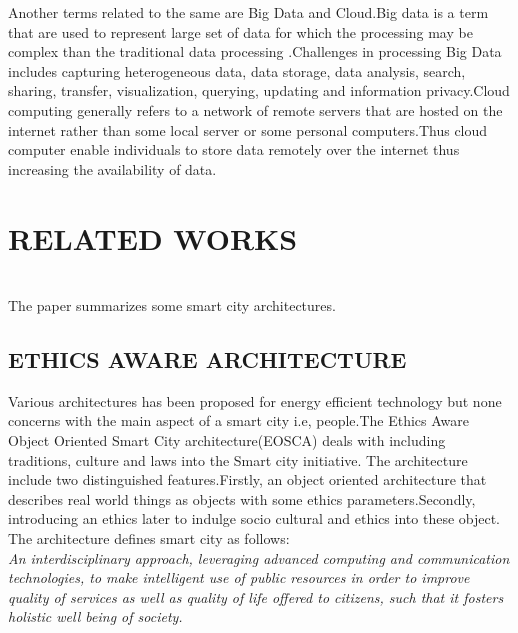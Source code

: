 \documentclass[10pt,a4paper,journal]{IEEEtran}
\begin{document}
\hspace{2em}Another terms related to the same are Big Data and Cloud.Big data is a term that are used to represent large set of data for which the processing may be complex than the traditional data processing .Challenges in processing Big Data includes  capturing heterogeneous data, data storage, data analysis, search, sharing, transfer, visualization, querying, updating and information privacy.Cloud computing generally refers to a network of remote servers that are hosted on the internet rather than some local server or some personal computers.Thus cloud computer enable individuals to store data remotely over the internet thus increasing the availability of data.


\section{RELATED WORKS}
\\
\hspace{2em}The paper summarizes some smart city architectures.

\subsection{ETHICS AWARE ARCHITECTURE}

\hspace{2em}Various architectures has been proposed for energy efficient technology but none concerns with the main aspect of a smart city i.e, people.The Ethics Aware Object Oriented Smart City architecture(EOSCA)\cite{3} deals with including traditions, culture and laws into the Smart city initiative.
\hspace{2em}The architecture include two distinguished features.Firstly, an object oriented architecture that describes real world things as objects with some ethics parameters.Secondly, introducing an ethics later to indulge socio cultural and ethics into these object.\\

\hspace{2em}The architecture defines smart city as follows:\\

\hspace{2em}\textit{An interdisciplinary approach, leveraging advanced computing and communication technologies, to make intelligent use of public resources in order to improve quality of services as well as quality of life offered to citizens, such that it fosters holistic well being of society.}\cite{3}\\
\end{document}
